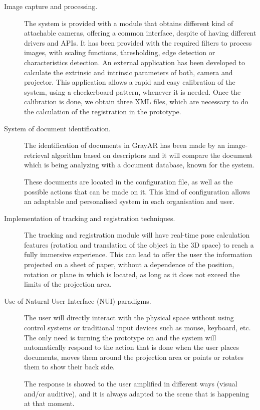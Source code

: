\begin{description}
\item [Image capture and processing.] The system is provided with a module that obtains different kind of attachable cameras, offering a common interface, despite of having different drivers and APIs. It has been provided with the required filters to process images, with scaling functions, thresholding, edge detection or characteristics detection. An external application has been developed to calculate the extrinsic and intrinsic parameters of both, camera and projector. This application allows a rapid and easy calibration of the system, using a checkerboard pattern, whenever it is needed. Once the calibration is done, we obtain three XML files, which are necessary to do the calculation of the registration in the prototype.

\item [System of document identification.] The identification of documents in GrayAR has been made by an image-retrieval algorithm based on descriptors and it will compare the document which is being analyzing with a document database, known for the system.

These documents are located in the configuration file, as well as the possible actions that can be made on it. This kind of configuration allows an adaptable and personalised system in each organisation and user.

\item [Implementation of tracking and registration techniques.] The tracking and registration module will have real-time pose calculation features (rotation and translation of the object in the 3D space) to reach a fully immersive experience. This can lead to offer the user the information projected on a sheet of paper, without a dependence of the position, rotation or plane in which is located, as long as it does not exceed the limits of the projection area. 


\item [Use of Natural User Interface (NUI) paradigms.] The user will directly interact with the physical space without using control systems or traditional input devices such as mouse, keyboard, etc. The only need is turning the prototype on and the system will automatically respond to the action that is done when the user places documents, moves them around the projection area or points or rotates them to show their back side.

The response is showed to the user amplified in different ways (visual and/or auditive), and it is always adapted to the scene that is happening at that moment. 



\end{description}
